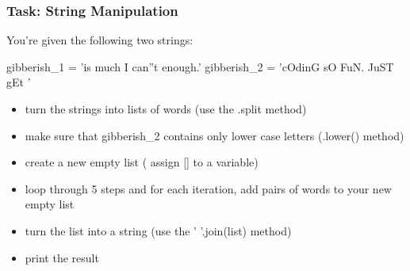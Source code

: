 \documentclass[11pt]{article}
\providecommand{\tightlist}{%
      \setlength{\itemsep}{0pt}\setlength{\parskip}{0pt}}
\newenvironment{Shaded}{}{}
\newcommand{\StringTok}[1]{\textcolor[rgb]{0.25,0.44,0.63}{{#1}}}
\newcommand{\NormalTok}[1]{{#1}}
\newcommand{\OperatorTok}[1]{\textcolor[rgb]{0.40,0.40,0.40}{{#1}}}
\begin{document}
    \subsubsection{\texorpdfstring{\textbf{Task: String
Manipulation}}{Task: String Manipulation}}\label{task-string-manipulation}

You're given the following two strings:

\begin{Shaded}
\begin{Highlighting}[]
\NormalTok{gibberish_1 }\OperatorTok{=} \StringTok{'is much I can''t enough.'}
\NormalTok{gibberish_2 }\OperatorTok{=} \StringTok{'cOdinG sO FuN. JuST gEt '}
\end{Highlighting}
\end{Shaded}

\begin{itemize}
\tightlist
\item
  turn the strings into lists of words (use the .split method)
\item
  make sure that gibberish\_2 contains only lower case letters (.lower()
  method)
\item
  create a new empty list ( assign {[}{]} to a variable)
\item
  loop through 5 steps and for each iteration, add pairs of words to
  your new empty list
\item
  turn the list into a string (use the ' '.join(list) method)
\item
  print the result
\end{itemize}
\end{document}

